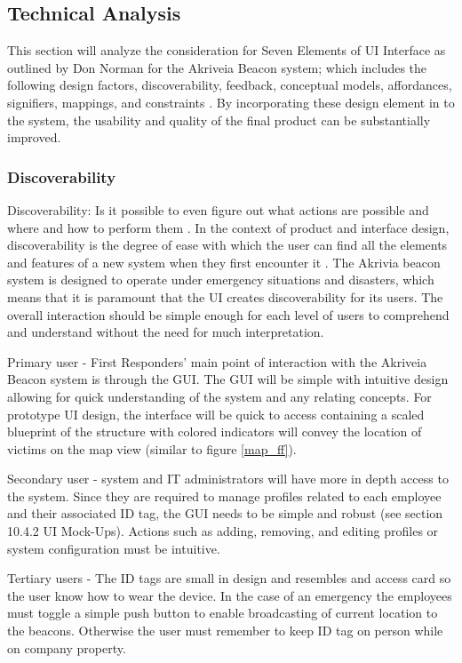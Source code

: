 

\subsection{Technical Analysis}
\bigskip
This section will analyze the consideration for Seven Elements of UI Interface as outlined by Don Norman for the Akriveia Beacon system; which includes the following design factors, discoverability, feedback, conceptual models, affordances, signifiers, mappings, and constraints \cite{R10-3-1}. By incorporating these design element in to the system, the usability and quality of the final product can be substantially improved. 
\medskip

\subsubsection{Discoverability}
\medskip
Discoverability: Is it possible to even figure out what actions are possible and where and how to perform them \cite{R10-3-1}.  In the context of product and interface design, discoverability is the degree of ease with which the user can find all the elements and features of a new system when they first encounter it \cite{R10-3-2}. The Akrivia beacon system is designed to operate under emergency situations and disasters, which means that it is paramount that the UI creates discoverability for its users. The overall interaction should be simple enough for each level of users to comprehend and understand without the need for much interpretation. 

\bigskip
Primary user - First Responders’ main point of interaction with the Akriveia Beacon system is through the GUI. The GUI will be simple with intuitive design allowing for quick understanding of the system and any relating concepts. For prototype UI design, the interface will be quick to access containing a scaled blueprint of the structure with colored indicators will convey the location of victims on the map view (similar to figure \ref{map_ff}). 

\bigskip
Secondary user - system and IT administrators will have more in depth access to the system. Since they are required to manage profiles related to each employee and their associated ID tag, the GUI needs to be simple and robust (see section 10.4.2 UI Mock-Ups). Actions such as adding, removing, and editing profiles or system configuration must be intuitive. 

\bigskip
Tertiary users - The ID tags are small in design and resembles and access card so the user know how to wear the device. In the case of an emergency the employees must toggle a simple push button to enable broadcasting of current location to the beacons. Otherwise the user must remember to keep ID tag on person while on company property.
\medskip


